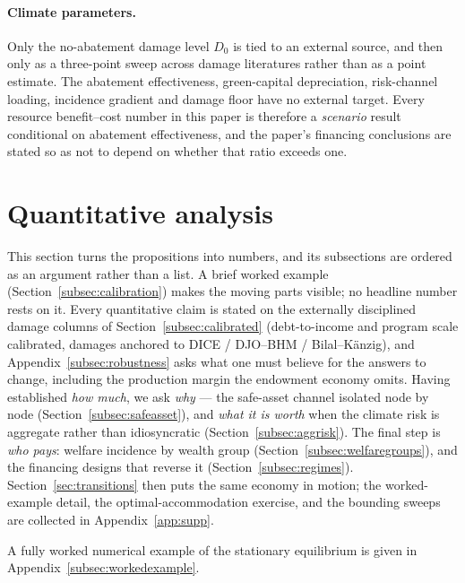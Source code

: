 \documentclass[12pt]{article}
\begin{document}
\paragraph{Climate parameters.} Only the no-abatement damage level $D_0$ is
tied to an external source, and then only as a three-point sweep across
damage literatures rather than as a point estimate. The abatement
effectiveness, green-capital depreciation, risk-channel loading, incidence
gradient and damage floor have no external target. Every
resource benefit--cost number in this paper is therefore a \emph{scenario}
result conditional on abatement effectiveness, and the paper's financing
conclusions are stated so as not to depend on whether that ratio exceeds one.

\section{Quantitative analysis}\label{sec:quant}

This section turns the propositions into numbers, and its subsections are
ordered as an argument rather than a list. A brief worked example
(Section~\ref{subsec:calibration}) makes the moving parts visible; no
headline number rests on it. Every quantitative claim is stated on the
externally disciplined damage columns of Section~\ref{subsec:calibrated}
(debt-to-income and program scale calibrated, damages anchored to DICE /
DJO--BHM / Bilal--K\"anzig), and Appendix~\ref{subsec:robustness} asks what one
must believe for the answers to change, including the production margin the
endowment economy omits. Having established \emph{how much}, we ask
\emph{why} --- the safe-asset channel isolated node by node
(Section~\ref{subsec:safeasset}), and \emph{what it is worth} when the
climate risk is aggregate rather than idiosyncratic
(Section~\ref{subsec:aggrisk}). The final step is \emph{who pays}: welfare
incidence by wealth group (Section~\ref{subsec:welfaregroups}), and the
financing designs that reverse it (Section~\ref{subsec:regimes}).
Section~\ref{sec:transitions} then puts the same economy in motion; the
worked-example detail, the optimal-accommodation exercise, and the bounding
sweeps are collected in Appendix~\ref{app:supp}.

A fully worked numerical example of the stationary equilibrium is given in Appendix~\ref{subsec:workedexample}.
\end{document}
